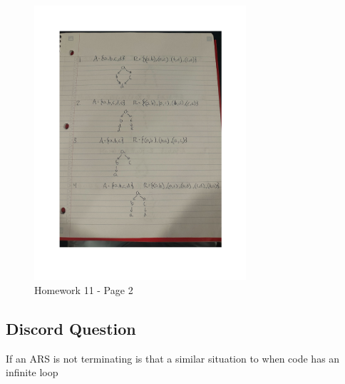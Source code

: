 \documentclass{article}
\theoremstyle{plain}
\theoremstyle{definition}
\theoremstyle{remark}
\begin{document}
\begin{figure}[H]
  \centering
  \includegraphics[width=0.7\textwidth, page=2]{HW11.pdf}
  \caption{Homework 11 - Page 2}
  \label{fig:homework11_page2}
\end{figure}


\subsection{Discord Question}

If an ARS is not terminating is that a similar situation to when code has an infinite loop
\end{document}
